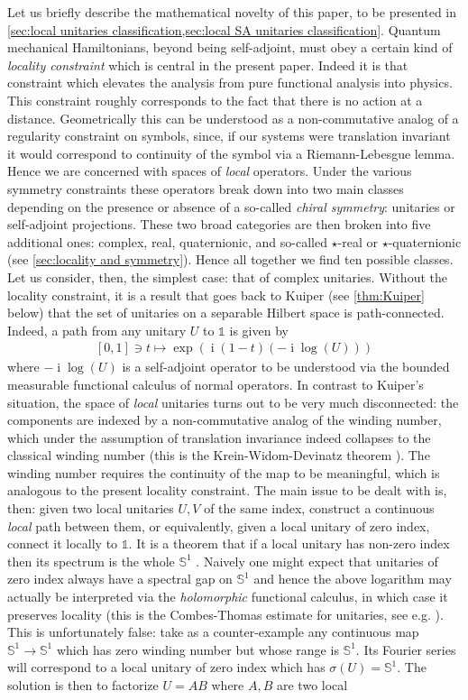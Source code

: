 \documentclass[a4paper,10pt]{article}
\numberwithin{equation}{section}
\theoremstyle{plain}
\theoremstyle{plain}
\theoremstyle{plain}
\theoremstyle{plain}
\theoremstyle{plain}
\theoremstyle{remark}
\theoremstyle{definition}
\theoremstyle{plain}
\newcommand{\ii}{\operatorname{i}}
\newcommand{\bS}{\mathbb{S}}
\newcommand{\Id}{\mathds{1}}
\newcommand{\eql}[1]{\begin{align}#1\end{align}}
\begin{document}
	Let us briefly describe the mathematical novelty of this paper, to be presented in \cref{sec:local unitaries classification,sec:local SA unitaries classification}. Quantum mechanical Hamiltonians, beyond being self-adjoint, must obey a certain kind of \emph{locality constraint} which is central in the present paper. Indeed it is that constraint which elevates the analysis from pure functional analysis into physics. This constraint roughly corresponds to the fact that there is no action at a distance. Geometrically this can be understood as a non-commutative analog of a regularity constraint on symbols, since, if our systems were translation invariant it would correspond to continuity of the symbol via a Riemann-Lebesgue lemma. Hence we are concerned with spaces of \emph{local} operators. Under the various symmetry constraints these operators break down into two main classes depending on the presence or absence of a so-called \emph{chiral symmetry}: unitaries or self-adjoint projections. These two broad categories are then broken into five additional ones: complex, real, quaternionic, and so-called $\star$-real or $\star$-quaternionic (see \cref{sec:locality and symmetry}). Hence all together we find ten possible classes. Let us consider, then, the simplest case: that of complex unitaries. Without the locality constraint, it is a result that goes back to Kuiper \cite{Kuiper1965} (see \cref{thm:Kuiper} below) that the set of unitaries on a separable Hilbert space is path-connected. Indeed, a path from any unitary $U$ to $\Id$ is given by \eql{\label{eq:Kuiper's path} [0,1]\ni t\mapsto \exp\left(\ii (1-t)\left(-\ii \log\left(U\right)\right)\right) } where $-\ii\log\left(U\right)$ is a self-adjoint operator to be understood via the bounded measurable functional calculus of normal operators. In contrast to Kuiper's situation, the space of \emph{local} unitaries turns out to be very much disconnected: the components are indexed by a non-commutative analog of the winding number, which under the assumption of translation invariance indeed collapses to the classical winding number (this is the Krein-Widom-Devinatz theorem \cite[pp. 185]{Douglas1998}). The winding number requires the continuity of the map to be meaningful, which is analogous to the present locality constraint. The main issue to be dealt with is, then: given two local unitaries $U,V$ of the same index, construct a continuous \emph{local} path between them, or equivalently, given a local unitary of zero index, connect it locally to $\Id$. It is a theorem that if a local unitary has non-zero index then its spectrum is the whole $\mathbb{S}^1$ \cite{AschBourgetJoye2020}. Naively one might expect that unitaries of zero index always have a spectral gap on $\mathbb{S}^1$ and hence the above logarithm may actually be interpreted via the \emph{holomorphic} functional calculus, in which case it preserves locality (this is the Combes-Thomas estimate for unitaries, see e.g. \cite{hamza2009dynamical,Shapiro2019}). This is unfortunately false: take as a counter-example any continuous map $\bS^1\to\bS^1$ which has zero winding number but whose range is $\bS^1$. Its Fourier series will correspond to a local unitary of zero index which has $\sigma(U)=\bS^1$. The solution is then to factorize $U=AB$ where $A,B$ are two local 
\end{document}
